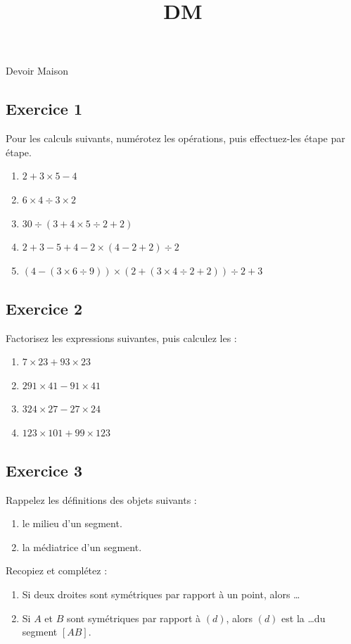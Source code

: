 \documentclass[14 pt]{extarticle}
\title{DM}
\date{}
\theoremstyle{plain}
\begin{document}
\begin{center}{\Large Devoir Maison}\\ 
 \end{center}
 \subsection*{Exercice 1 }
 
Pour les calculs suivants, numérotez les opérations, puis effectuez-les étape par étape. \begin{enumerate}
\item $2+3\times 5 - 4$
\item $6\times 4 \div 3 \times 2$
\item $30 \div (3 + 4\times 5 \div 2+2)$
\item $2 + 3 - 5 + 4 - 2 \times (4 - 2 + 2) \div 2$
\item $(4 - (3\times 6 \div 9)) \times (2 + (3\times 4 \div 2+2))\div 2 + 3$
\end{enumerate}
 
 \subsection*{Exercice 2 }
Factorisez les expressions suivantes, puis calculez les : 
\begin{enumerate}
\item $7 \times 23 + 93 \times 23$
\item $ 291 \times 41 - 91 \times 41$
\item $ 324 \times 27 - 27 \times 24$
\item $ 123 \times 101 + 99 \times 123$
\end{enumerate}
\subsection*{Exercice 3} 
Rappelez les définitions des objets suivants : \begin{enumerate}
\item le milieu d'un segment.
\item la médiatrice d'un segment. 
\end{enumerate}
Recopiez et complétez : 
\begin{enumerate}
\item Si deux droites sont symétriques par rapport à un point, alors \ldots
\item Si $A$ et $B$ sont symétriques par rapport à $(d)$, 
alors $(d)$ est la \ldots du segment $[AB]$. 
\end{enumerate}
\end{document}
